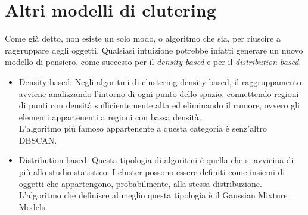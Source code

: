 \section{Altri modelli di clutering}
	Come già detto, non esiste un solo modo, o algoritmo che sia, per riuscire a raggruppare degli oggetti. Qualsiasi intuizione potrebbe infatti generare un nuovo modello di pensiero, come successo per il \emph{density-based} e per il \emph{distribution-based}. 

	\begin{itemize}
		\item Density-based:
			Negli algoritmi di clustering density-based, il raggruppamento avviene analizzando l'intorno di ogni punto dello spazio, connettendo regioni di punti con densità sufficientemente alta ed eliminando il rumore, ovvero gli elementi appartenenti a regioni con bassa densità\cite{Density_based_clustering}.\\
			L'algoritmo più famoso appartenente a questa categoria è senz'altro DBSCAN.
		
		\item Distribution-based:
			Questa tipologia di algoritmi è quella che si avvicina di più allo studio statistico. I cluster possono essere definiti come insiemi di oggetti che appartengono, probabilmente, alla stessa distribuzione\cite{distribution-based_clustering}. \\
			L'algoritmo che definisce al meglio questa tipologia è il Gaussian Mixture Models.
	\end{itemize}